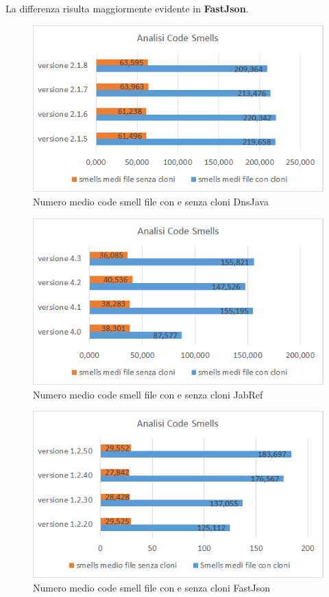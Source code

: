 La differenza risulta maggiormente evidente in \textbf{FastJson}.
\begin{figure}[h]
	\centering
	\includegraphics[scale=0.75, trim = 0cm 0cm 0cm 0cm, clip=true]{Grafici_dnsJava/CodeSmells.png}
	\caption{Numero medio code smell file con e senza cloni DnsJava}
	\label{fig:codeSmellDnsJava}	
\end{figure}
\begin{figure}[h]
	\centering
	\includegraphics[scale=0.75, trim = 0cm 0cm 0cm 0cm, clip=true]{Grafici_jabRef/CodeSmells.png}
	\caption{Numero medio code smell file con e senza cloni JabRef}
	\label{fig:codeSmellJabRef}
\end{figure}
\begin{figure}[h]
	\centering
	\includegraphics[scale=0.75, trim = 0cm 0cm 0cm 0cm, clip=true]{Grafici_fastJson/CodeSmell.png}
	\caption{Numero medio code smell file con e senza cloni FastJson}
	\label{fig:codeSmellFastjson}
\end{figure}
